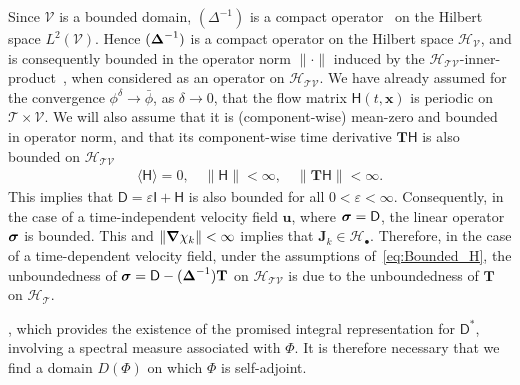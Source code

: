 \documentclass[leqno,onefignum,onetabnum]{siamltex1213}
\newcommand{\Tb}{\mathbf{T}}
\newcommand{\Tc}{\mathcal{T}}
\newcommand{\Vc}{\mathcal{V}}
\newcommand{\Hc}{\mathcal{H}}
\newcommand{\Dm}{\mathsf{D}}
\newcommand{\Hm}{\mathsf{H}}
\newcommand{\Ib}{\mathsf{I}}
\newcommand\bsig{\mbox{\boldmath${\sigma}$}}
\newcommand\bDelta{\mbox{\boldmath${\Delta}$}}
\newcommand\bnabla{\mbox{\boldmath${\nabla}$}}
\newcommand{\vecJ}{\boldsymbol{J}}
\newcommand{\vecx}{\boldsymbol{x}}
\newcommand{\vecu}{\boldsymbol{u}}
\begin{document}
Since $\Vc$ is a bounded domain, $(\Delta^{-1})$ is a compact
operator~\cite{Stakgold:BVP:2000} on the Hilbert space
$L^2(\Vc)$. Hence 
$(\bDelta^{-1})$ is a compact operator on the Hilbert space
$\Hc_{\Vc}$, and is consequently bounded in the operator norm $\|\cdot\|$
induced by the
$\Hc_{\Tc\Vc}$-inner-product~\cite{Reed-1980,Stone:64,Stakgold:BVP:2000},
when considered as an  
operator on $\Hc_{\Tc\Vc}$.  We have already assumed 
for the convergence $\phi^\delta\to\bar{\phi}$, as $\delta\to0$, that the flow matrix
$\Hm(t,\vecx)$ is periodic on $\Tc\times\Vc$. We will also assume that it
is (component-wise) mean-zero and bounded in operator norm, and that
its component-wise time derivative $\Tb\Hm$ is also bounded on
$\Hc_{\Tc\Vc}$ 
%
\begin{align}%
  \langle\Hm\rangle=0, \quad \|\Hm\|<\infty, \quad \|\Tb\Hm\|<\infty.
\end{align}
%
This implies that $\Dm=\varepsilon\Ib+\Hm$ is also bounded for all
$0<\varepsilon<\infty$. Consequently, in the case of a time-independent velocity 
field $\vecu $, where $\bsig=\Dm$, the linear operator $\bsig$ is
bounded. This and $\|\bnabla \chi_k\|<\infty$ implies that 
$\vecJ_k\in\Hc_\bullet$. Therefore, in the case of a time-dependent velocity
field, under the assumptions of~\eqref{eq:Bounded_H}, the
unboundedness of $\bsig=\Dm-(\bDelta^{-1})\Tb$ on $\Hc_{\Tc\Vc}$
is due to the unboundedness of $\Tb$ on $\Hc_{\Tc}$.   






, which provides the existence of the promised   
integral representation for $\Dm^*$, involving a spectral measure
associated with $\Phi$. It is therefore necessary that we find a
domain $D(\Phi)$ on which $\Phi$ is self-adjoint.
\end{document}

